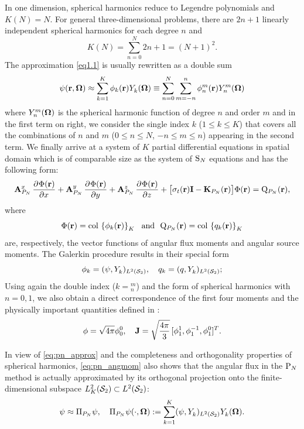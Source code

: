 In one dimension, spherical harmonics reduce to 
Legendre polynomials and $ K(N) = N$.
For general three-dimensional problems, there are $2n + 1$ linearly independent spherical harmonics for each degree $n$ 
and 
$$ 
	K(N) = \sum_{n=0}^{N} 2n + 1 = (N+1)^2.
$$
%
The approximation \eqref{eq1.1} is usually rewritten as a double sum
\begin{equation}\label{eq:pn_approx}
	\psi(\br,\bomega) \approx \sum_{k=1}^{ K} \phi_k(\br)\Y{k}{}(\bomega) \equiv
	\suma[n]{0}{N}\suma[m]{-n}{n}\angmom{n}{m}(\br)\Y{n}{m}(\bomega)
\end{equation}
where $\Y{n}{m}(\bomega)$ is the spherical harmonic function of degree $n$ and order $m$
and in the first term on right, we consider the single index $k$ ($1 \leq k \leq  K$) that covers all the combinations of $n$ and $m$ ($0 \leq n \leq N$, $-n\leq m \leq n$) appearing in the second term. We finally arrive at a system of $ K$
partial differential equations in spatial domain which is of comparable size as the system of $\SN$ equations and has the following form:
\begin{equation}\label{eq:pn1}
	\mat{A}^x_{P_N}\,\pd{\Phi(\br)}{x} + \mat{A}^y_{P_N}\,\pd{\Phi(\br)}{y} + \mat{A}^z_{P_N}\,\pd{\Phi(\br)}{z} +
	\bigl[\sigma_t(\br)\mat{I} - \mathbf{K}_{P_N}(\br)\bigr]\Phi(\br) = \mathrm{Q}_{P_N}(\br),
\end{equation}
where 
\begin{equation}\label{eq:pn_vectors}
	\Phi(\br) = \col\left\{\phi_k(\br)\right\}_{\idxset{K}} \ \text{ and }\ 
	\mathrm{Q}_{P_N}(\br) = \col\left\{q_k(\br)\right\}_{\idxset{K}}
\end{equation}
are, respectively, the vector functions of angular flux
moments and angular source moments.
The
Galerkin procedure results in their special form
\begin{equation}\label{eq:pn_angmom}
	\phi_k = (\psi, \Y{k}{})_{\Lp[2](\Sphere)},\quad q_k = (q, \Y{k}{})_{\Lp[2](\Sphere)};
\end{equation}
Using again the double index ($k = {}_n^m$) and the form of spherical harmonics with $n = 0,1$, we also obtain a direct
correspondence of the first four moments and the physically important quantities defined in \sref{sec:qoi}:
$$
	\phi = \sqrt{4\pi}\angmom{0}{0},\quad \bJ = \sqrt{\frac{4\pi }{3}}\, [\angmom{1}{1}, \angmom{1}{-1}, \angmom{1}{0}]^T.
$$


In view of \eqref{eq:pn_approx} and the completeness and orthogonality properties of spherical harmonics,
\eqref{eq:pn_angmom} also shows that the angular flux in the $\PN$ method is actually approximated by its orthogonal
projection onto the finite-dimensional subspace $\Lp[2]_K(\Sphere)\subset\Lp[2](\Sphere)$:
\begin{equation}\label{eq:PN_proj}
	\psi \approx \Projop\psi, \quad \Projop\psi(\cdot,\bomega) := \sum_{k=1}^{ K}\ips{\psi}{\Y{k}{}} \Y{k}{}(\bomega).
\end{equation}

